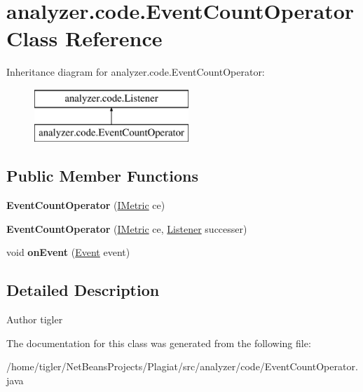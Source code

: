 \hypertarget{classanalyzer_1_1code_1_1EventCountOperator}{}\section{analyzer.\+code.\+Event\+Count\+Operator Class Reference}
\label{classanalyzer_1_1code_1_1EventCountOperator}
Inheritance diagram for analyzer.\+code.\+Event\+Count\+Operator\+:\begin{figure}[H]
\begin{center}
\leavevmode
\includegraphics[height=2.000000cm]{classanalyzer_1_1code_1_1EventCountOperator}
\end{center}
\end{figure}
\subsection*{Public Member Functions}
\begin{DoxyCompactItemize}
\item 
\mbox{\label{classanalyzer_1_1code_1_1EventCountOperator_a74ef4c2d87ce6b3ff05194e74893e8c4}} 
{\bfseries Event\+Count\+Operator} (\hyperlink{interfaceanalyzer_1_1code_1_1IMetric}{I\+Metric} ce)
\item 
\mbox{\label{classanalyzer_1_1code_1_1EventCountOperator_ac8a9f1fafedc773a304a5949b948e960}} 
{\bfseries Event\+Count\+Operator} (\hyperlink{interfaceanalyzer_1_1code_1_1IMetric}{I\+Metric} ce, \hyperlink{classanalyzer_1_1code_1_1Listener}{Listener} successer)
\item 
\mbox{\label{classanalyzer_1_1code_1_1EventCountOperator_abd2a8d557f0cae911e61133c0e90697b}} 
void {\bfseries on\+Event} (\hyperlink{classanalyzer_1_1code_1_1Event}{Event} event)
\end{DoxyCompactItemize}


\subsection{Detailed Description}
\begin{DoxyAuthor}{Author}
tigler 
\end{DoxyAuthor}


The documentation for this class was generated from the following file\+:\begin{DoxyCompactItemize}
\item 
/home/tigler/\+Net\+Beans\+Projects/\+Plagiat/src/analyzer/code/Event\+Count\+Operator.\+java\end{DoxyCompactItemize}
